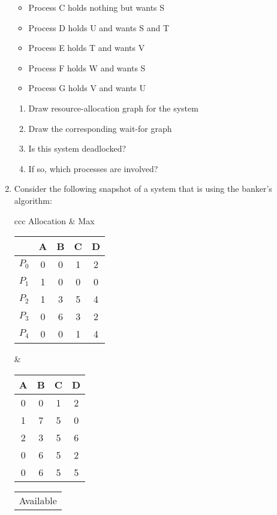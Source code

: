 \documentclass{article}
\begin{document}
\begin{enumerate}
\begin{itemize}
			\item Process C holds nothing but wants S
			\item Process D holds U and wants S and T
			\item Process E holds T and wants V
			\item Process F holds W and wants S
			\item Process G holds V and wants U
		\end{itemize}
		\begin{enumerate}
			\item Draw resource-allocation graph for the system
			\item Draw the corresponding wait-for graph
			\item Is this system deadlocked?
			\item If so, which processes are involved?
		\end{enumerate}
		\item Consider the following snapshot of a system that is using the banker’s algorithm:
		\begin{table*}[h]
			\centering
			\begin{tabular}{ccc}
				Allocation & Max \\
				\begin{tabular}{lcccc}
					& A & B & C & D \\\hline
					$P_0$ & 0 & 0 & 1 & 2 \\
					$P_1$ & 1 & 0 & 0 & 0 \\
					$P_2$ & 1 & 3 & 5 & 4 \\
					$P_3$ & 0 & 6 & 3 & 2 \\
					$P_4$ & 0 & 0 & 1 & 4 \\
				\end{tabular}
				&
				\begin{tabular}{cccc}
					A & B & C & D \\\hline
					0 & 0 & 1 & 2 \\
					1 & 7 & 5 & 0 \\
					2 & 3 & 5 & 6 \\
					0 & 6 & 5 & 2 \\
					0 & 6 & 5 & 5 \\
				\end{tabular}
			\end{tabular}
		\end{table*}
		\begin{table*}[h]
			\centering
			\begin{tabular}{c}
				Available                     \\

\end{tabular}
\end{table*}
\end{enumerate}
\end{document}

